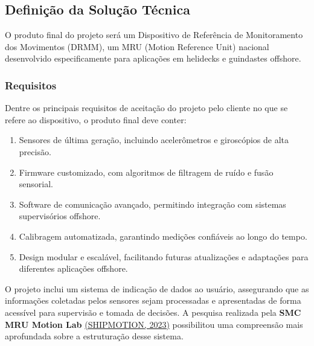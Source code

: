 \documentclass[a4paper, 12pt]{article}
\begin{document}
    \newpage
    \subsection{Definição da Solução Técnica}
        O produto final do projeto será um Dispositivo de Referência de Monitoramento dos Movimentos (DRMM), um MRU (Motion Reference Unit) nacional desenvolvido especificamente para aplicações em helidecks e guindastes offshore. 

        \subsubsection{Requisitos}
            Dentre os principais requisitos de aceitação do projeto pelo cliente no que se refere ao dispositivo, o produto final deve conter: 
    
            \begin{enumerate}
                \item Sensores de última geração, incluindo acelerômetros e giroscópios de alta precisão.
                \vspace{-0.15cm}
                
                \item Firmware customizado, com algoritmos de filtragem de ruído e fusão sensorial.
                \vspace{-0.15cm}
                
                \item Software de comunicação avançado, permitindo integração com sistemas supervisórios offshore.
                \vspace{-0.15cm}
                
                \item Calibragem automatizada, garantindo medições confiáveis ao longo do tempo.
                \vspace{-0.15cm}
                
                \item Design modular e escalável, facilitando futuras atualizações e adaptações para diferentes aplicações offshore.
            \end{enumerate}
            \vspace{-0.1cm}

        
        O projeto inclui um sistema de indicação de dados ao usuário, assegurando que as informações coletadas pelos sensores sejam processadas e apresentadas de forma acessível para supervisão e tomada de decisões. A pesquisa realizada pela \textbf{SMC MRU Motion Lab} \hyperlink{SHIPMOTION}{(SHIPMOTION, 2023)} possibilitou uma compreensão mais aprofundada sobre a estruturação desse sistema. 
        
\end{document}
